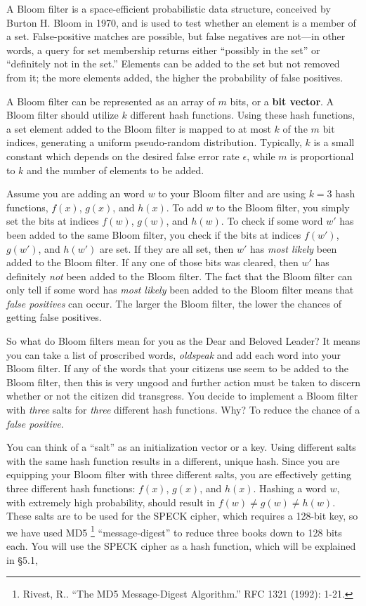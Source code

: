 \documentclass{article}
\begin{document}
A Bloom filter is a space-efficient probabilistic data structure,
conceived by Burton H. Bloom in 1970, and is used to test whether
an element is a member of a set. False-positive matches are possible,
but false negatives are not---in other words, a query for set membership
returns either ``possibly in the set'' or ``definitely not in the set.''
Elements can be added to the set but not removed from it; the more
elements added, the higher the probability of false positives.

A Bloom filter can be represented as an array of $m$ bits, or a
\textbf{bit vector}. A Bloom filter should utilize $k$ different hash
functions. Using these hash functions, a set element added to the Bloom
filter is mapped to at most $k$ of the $m$ bit indices, generating a
uniform pseudo-random distribution. Typically, $k$ is a small constant
which depends on the desired false error rate $\epsilon$, while $m$ is
proportional to $k$ and the number of elements to be added.

Assume you are adding an word $w$ to your Bloom filter and are using
$k=3$ hash functions, $f(x)$, $g(x)$, and $h(x)$. To add $w$ to the
Bloom filter, you simply set the bits at indices $f(w)$, $g(w)$, and
$h(w)$. To check if some word $w'$ has been added to the same Bloom
filter, you check if the bits at indices $f(w')$, $g(w')$, and $h(w')$
are set. If they are all set, then $w'$ has \emph{most likely} been
added to the Bloom filter. If any one of those bits was cleared, then
$w'$ has definitely \emph{not} been added to the Bloom filter. The fact
that the Bloom filter can only tell if some word has \emph{most likely}
been added to the Bloom filter means that \emph{false positives} can
occur. The larger the Bloom filter, the lower the chances of getting
false positives.

So what do Bloom filters mean for you as the Dear and Beloved Leader?
It means you can take a list of proscribed words, \emph{oldspeak} and
add each word into your Bloom filter. If any of the words that your
citizens use seem to be added to the Bloom filter, then this is very
ungood and further action must be taken to discern whether or not the
citizen did transgress. You decide to implement a Bloom filter with
\emph{three} salts for \emph{three} different
hash functions. Why? To reduce the chance of a \emph{false positive}.

You can think of a ``salt'' as an initialization vector or a key.
Using different salts with the same hash function results in a
different, unique hash. Since you are equipping your Bloom filter with
three different salts, you are effectively getting three different hash
functions: $f(x)$, $g(x)$, and $h(x)$. Hashing a word $w$, with
extremely high probability, should result in $f(w) \ne g(w) \ne h(w)$.
These salts are to be used for the SPECK cipher, which requires a
128-bit key, so we have used MD5 \footnote{Rivest, R.. “The MD5
Message-Digest Algorithm.” RFC 1321 (1992): 1-21.} ``message-digest'' to
reduce three books down to 128 bits each. You will use the SPECK cipher
as a hash function, which will be explained in \S 5.1,
\end{document}
